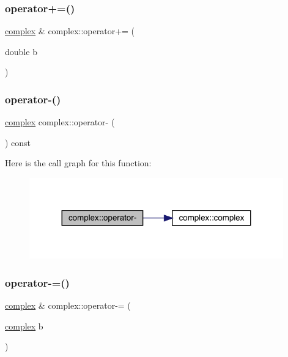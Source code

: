 \mbox{\label{classcomplex_ae776ea1bee9bed9540597a671abc3953}} 
\subsubsection{\texorpdfstring{operator+=()}{operator+=()}\hspace{0.1cm}{\footnotesize\ttfamily [2/2]}}
{\footnotesize\ttfamily \mbox{\hyperlink{classcomplex}{complex}} \& complex\+::operator+= (\begin{DoxyParamCaption}\item[{double}]{b }\end{DoxyParamCaption})}

\mbox{\label{classcomplex_a969988c8e6c2a3af52c64e531471f6c0}} 
\subsubsection{\texorpdfstring{operator-\/()}{operator-()}}
{\footnotesize\ttfamily \mbox{\hyperlink{classcomplex}{complex}} complex\+::operator-\/ (\begin{DoxyParamCaption}{ }\end{DoxyParamCaption}) const}

Here is the call graph for this function\+:\nopagebreak
\begin{figure}[H]
\begin{center}
\leavevmode
\includegraphics[width=311pt]{classcomplex_a969988c8e6c2a3af52c64e531471f6c0_cgraph}
\end{center}
\end{figure}
\mbox{\label{classcomplex_af797416b6b4b45c2bb54958fcd076a0e}} 
\subsubsection{\texorpdfstring{operator-\/=()}{operator-=()}\hspace{0.1cm}{\footnotesize\ttfamily [1/2]}}
{\footnotesize\ttfamily \mbox{\hyperlink{classcomplex}{complex}} \& complex\+::operator-\/= (\begin{DoxyParamCaption}\item[{\mbox{\hyperlink{classcomplex}{complex}}}]{b }\end{DoxyParamCaption})}

